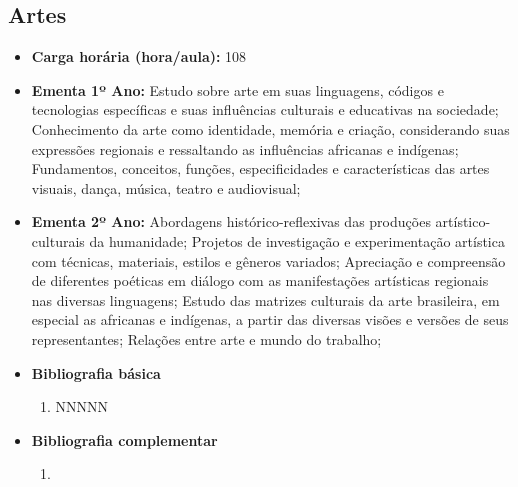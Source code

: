\documentclass[11pt,fleqn]{book} %
\begin{document}
\subsection{Artes}\label{disc:artes}
\begin{itemize}
	\item \textbf{Carga horária (hora/aula):} 108
	\item \textbf{Ementa 1º Ano:}
	Estudo sobre arte em suas linguagens, códigos e tecnologias específicas e suas influências culturais e educativas na sociedade;
	Conhecimento da arte como identidade, memória e criação, considerando suas expressões regionais e ressaltando as influências africanas e indígenas;
	Fundamentos, conceitos, funções, especificidades e características das artes visuais, dança, música, teatro e audiovisual;
	\item \textbf{Ementa 2º Ano:}
	Abordagens histórico-reflexivas das produções artístico-culturais da humanidade;
	Projetos de investigação e experimentação artística com técnicas, materiais, estilos e gêneros variados;
	Apreciação e compreensão de diferentes poéticas em diálogo com as manifestações artísticas regionais nas diversas linguagens;
	Estudo das matrizes culturais da arte brasileira, em especial as africanas e indígenas, a partir das diversas visões e versões de seus representantes;
	Relações entre arte e mundo do trabalho;
	\item \textbf{Bibliografia básica}
	\begin{enumerate}
		\item NNNNN
	\end{enumerate}
	\item \textbf{Bibliografia complementar}
	\begin{enumerate}
		\item 
	\end{enumerate}	
\end{itemize}

\newpage
\end{document}
